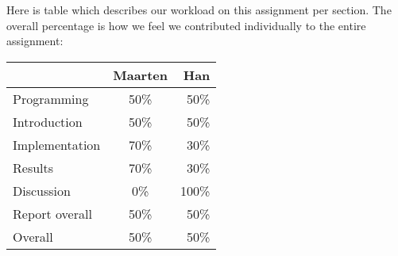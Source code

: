 Here is table which describes our workload on this assignment per section. The overall percentage is how we feel we contributed individually to the entire assignment:

\begin{tabular}{ l | c | r }
    & Maarten & Han \\ \hline
  Programming & 50\% & 50\% \\
  Introduction & 50\% & 50\% \\
  Implementation & 70\% & 30\% \\
  Results & 70\% & 30\% \\
  Discussion & 0\% & 100\% \\
  Report overall & 50\% & 50\% \\ \hline \hline
  Overall & 50\% & 50\%
\end{tabular}